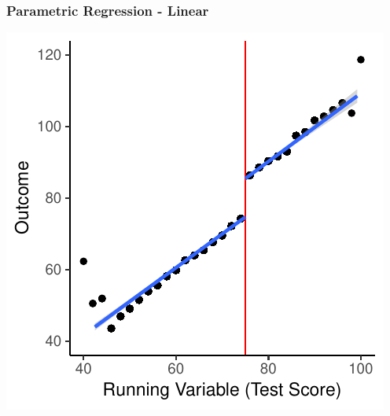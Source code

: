 \documentclass[xcolor=x11names,compress]{beamer}\usepackage[]{graphicx}\usepackage[]{color}
\makeatletter
\def\maxwidth{ %
  \ifdim\Gin@nat@width>\linewidth
    \linewidth
  \else
    \Gin@nat@width
  \fi
}
\newenvironment{knitrout}{}{} %
\renewcommand{\(}{\begin{columns}}
\renewcommand{\)}{\end{columns}}
\newcommand{\<}[1]{\begin{column}{#1}}
\renewcommand{\>}{\end{column}}
\makeatother
\begin{document}
\begin{frame}
\frametitle{Parametric Regression - Linear}
\begin{center}
\begin{knitrout}
\color{fgcolor}
\includegraphics[width=\maxwidth]{figure/chart4-1} 

\end{knitrout}
\end{center}
\end{frame}
\end{document}
